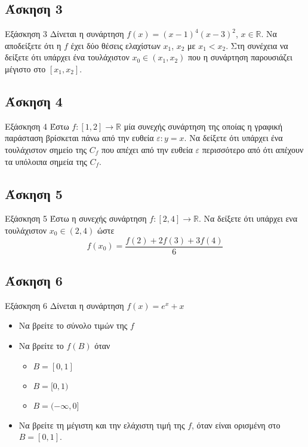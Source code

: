 \documentclass[greek]{beamer}
\begin{document}
\subsection{Άσκηση 3}
\begin{frame}[label=Άσκηση3]{Εξάσκηση 3}
 Δίνεται η συνάρτηση $f(x)=(x-1)^4(x-3)^2$, $x\in \mathbb{R}$. Να αποδείξετε ότι η $f$ έχει δύο θέσεις ελαχίστων $x_1$, $x_2$ με $x_1<x_2$. Στη συνέχεια να δείξετε ότι υπάρχει ένα τουλάχιστον $x_0\in (x_1,x_2)$ που η συνάρτηση παρουσιάζει μέγιστο στο $[x_1,x_2]$.

 \hyperlink{Λύση3}{}
\end{frame}

\subsection{Άσκηση 4}
\begin{frame}[label=Άσκηση4]{Εξάσκηση 4}
 Έστω $f:[1,2]\to\mathbb{R}$ μία συνεχής συνάρτηση της οποίας η γραφική παράσταση βρίσκεται πάνω από την ευθεία $ε:y=x$. Να δείξετε ότι υπάρχει ένα τουλάχιστον σημείο της $C_f$ που απέχει από την ευθεία $ε$ περισσότερο από ότι απέχουν τα υπόλοιπα σημεία της $C_f$.

 \hyperlink{Λύση4}{}
\end{frame}

\subsection{Άσκηση 5}
\begin{frame}[label=Άσκηση5]{Εξάσκηση 5}
 Έστω η συνεχής συνάρτηση $f:[2,4]\to\mathbb{R}$. Να δείξετε ότι υπάρχει ενα τουλάχιστον $x_0\in (2,4)$ ώστε
 $$f(x_0)=\frac{f(2)+2f(3)+3f(4)}{6}$$

 \hyperlink{Λύση5}{}
\end{frame}

\subsection{Άσκηση 6}
\begin{frame}[label=Άσκηση6]{Εξάσκηση 6}
 Δίνεται η συνάρτηση $f(x)=e^x+x$
 \begin{itemize}
  \item<1-> Να βρείτε το σύνολο τιμών της $f$
  \item<2-> Να βρείτε το $f(Β)$ όταν
        \begin{itemize}
         \item<3-> $Β=[0,1]$
         \item<4-> $Β=[0,1)$
         \item<5-> $Β=(-\infty,0]$
        \end{itemize}
  \item<6-> Να βρείτε τη μέγιστη και την ελάχιστη τιμή της $f$, όταν είναι ορισμένη στο $Β=[0,1]$.
 \end{itemize}

 \hyperlink{Λύση6}{}
\end{frame}
\end{document}
